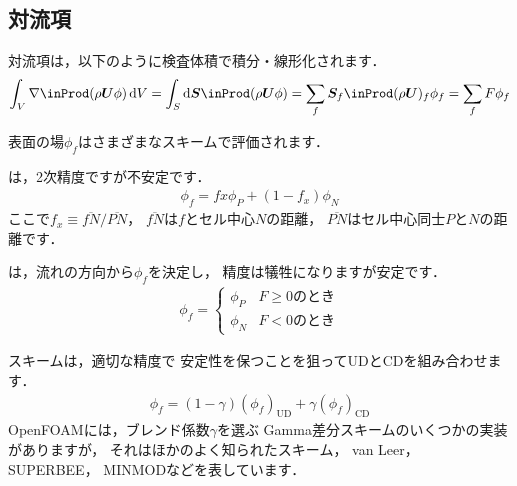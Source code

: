 \subsection{対流項}
\label{ssec:2.4.2}
%
対流項は，以下のように検査体積で積分・線形化されます．
\begin{align}
 \label{eq:2.16}
 \int_{V}\nabla \inProd (\rho\bm{U}\phi)\,\mathrm{d}V
 = \int_{S}\mathrm{d}\bm{S} \inProd (\rho\bm{U}\phi)
 = \sum_{f}\bm{S}_{f} \inProd (\rho\bm{U})_{f}\phi_{f}
 = \sum_{f}F\phi_{f}
\end{align}

表面の場$\phi_{f}$はさまざまなスキームで評価されます．
\begin{description}
%
%
 \item[中心差分 (CD)] は，2次精度ですが不安定です．
            \begin{align}
             \label{eq:2.17}
             \phi_{f} = f{x}\phi_{P} + (1 - f_{x})\phi_{N}
            \end{align}
            ここで$f_{x} \equiv \overline{fN}/\overline{PN}$，
            $\overline{fN}$は$f$とセル中心$N$の距離，
            $\overline{PN}$はセル中心同士$P$と$N$の距離です．
%
%
 \item[風上差分 (UD)] は，流れの方向から$\phi_{f}$を決定し，
            精度は犠牲になりますが安定です．
            \begin{align}
             \label{eq:2.18}
             \phi_{f} =
             \begin{cases}
              \phi_{P} & F \ge 0 \text{のとき} \\
              \phi_{N} & F < 0 \text{のとき}
             \end{cases}
            \end{align}
%
%
 \item[ブレンド差分 (BD)] スキームは，適切な精度で
            安定性を保つことを狙ってUDとCDを組み合わせます．
            \begin{align}
             \phi_{f} = (1 - \gamma)(\phi_{f})_{\mathrm{UD}} + \gamma(\phi_{f})_{\mathrm{CD}}
            \end{align}
            OpenFOAMには，ブレンド係数$\gamma$を選ぶ
%
%
            Gamma差分スキームのいくつかの実装がありますが，
            それはほかのよく知られたスキーム，
%
%
            van Leer，
%
%
            SUPERBEE，
%
%
            MINMODなどを表しています．
\end{description}


